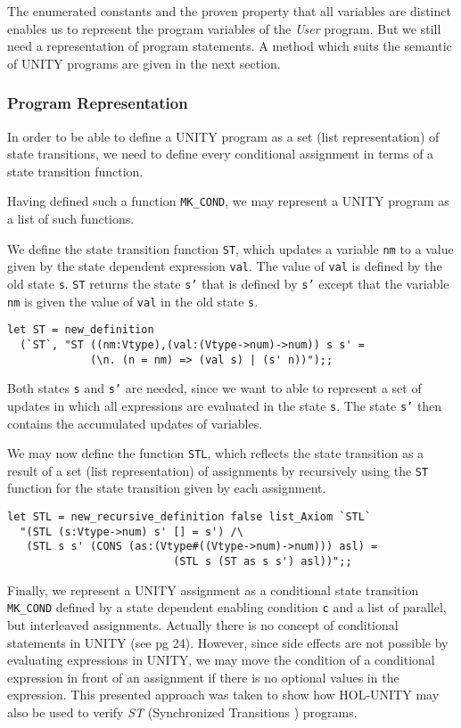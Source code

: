 The enumerated constants and the proven property that all variables are
distinct enables us to represent the program variables of the {\it User}
program.  But we still need a representation of program statements.  A method
which suits the semantic of UNITY programs are given in the next section.


\subsubsection{Program Representation}

In order to be able to define a UNITY program as a set (list representation) of
state transitions, we need to define every conditional assignment in terms of a
state transition function.

Having defined such a function {\tt MK\_COND}, we may represent a UNITY 
program as a list of such functions.

We define the state transition function {\tt ST}, which updates a variable 
{\tt nm} to a value given by the state dependent expression {\tt val}. The
value of {\tt val} is defined by the old state {\tt s}. {\tt ST} returns the
state {\tt s'} that is defined by {\tt s'} except that the variable {\tt nm} is
given the value of {\tt val} in the old state {\tt s}.

{\footnotesize 
\begin{verbatim}
let ST = new_definition
  (`ST`, "ST ((nm:Vtype),(val:(Vtype->num)->num)) s s' =
             (\n. (n = nm) => (val s) | (s' n))");;
\end{verbatim}
}

Both states {\tt s} and {\tt s'} are needed, since we want to able to represent 
a set of updates in which all expressions are evaluated in the state {\tt s}.
The state {\tt s'} then contains the accumulated updates of variables.

We may now define the function {\tt STL}, which reflects the state transition 
as a result of a set (list representation) of assignments by recursively using 
the {\tt ST} function for the state transition given by each assignment.

{\footnotesize 
\begin{verbatim}
let STL = new_recursive_definition false list_Axiom `STL`
  "(STL (s:Vtype->num) s' [] = s') /\
   (STL s s' (CONS (as:(Vtype#((Vtype->num)->num))) asl) =
                          (STL s (ST as s s') asl))";;
\end{verbatim}
}

Finally, we represent a UNITY assignment as a conditional state transition 
{\tt MK\_COND} defined by a state dependent enabling condition {\tt c} and a 
list of parallel, but interleaved assignments.  Actually there is no concept 
of conditional statements in UNITY (see \cite{CM88} pg 24).  However, since 
side effects are not possible by evaluating expressions in UNITY, we may move 
the condition of a conditional expression in front of an assignment if there 
is no optional values in the expression.  This presented approach was taken to
show how HOL-UNITY may also be used to verify {\it ST}
(Synchronized Transitions \cite{JST88}) programs.


